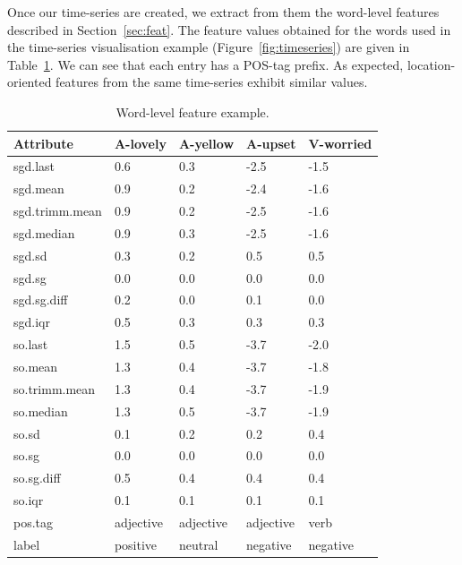 \documentclass{sig-alternate}
\begin{document}
   
Once our time-series are created, we extract from them the word-level features described in Section~\ref{sec:feat}. The feature values obtained for the words used in the time-series visualisation example (Figure~\ref{fig:timeseries}) are given in Table~\ref{fig:featex}.  We can see that each entry has a POS-tag prefix.  As expected, location-oriented features from the same time-series exhibit similar values. %

\begin{table}[htb]
\scriptsize
\centering
\begin{tabular}{l|llll}
  \hline
Attribute & A-lovely & A-yellow & A-upset & V-worried \\ 
  \hline
sgd.last &  0.6 &  0.3 & -2.5 & -1.5 \\ 
  sgd.mean &  0.9 &  0.2 & -2.4 & -1.6 \\ 
  sgd.trimm.mean &  0.9 &  0.2 & -2.5 & -1.6 \\ 
  sgd.median &  0.9 &  0.3 & -2.5 & -1.6 \\ 
  sgd.sd & 0.3 & 0.2 & 0.5 & 0.5 \\ 
  sgd.sg & 0.0 & 0.0 & 0.0 & 0.0 \\ 
  sgd.sg.diff & 0.2 & 0.0 & 0.1 & 0.0 \\ 
  sgd.iqr & 0.5 & 0.3 & 0.3 & 0.3 \\ 
  so.last &  1.5 &  0.5 & -3.7 & -2.0 \\ 
  so.mean &  1.3 &  0.4 & -3.7 & -1.8 \\ 
  so.trimm.mean &  1.3 &  0.4 & -3.7 & -1.9 \\ 
  so.median &  1.3 &  0.5 & -3.7 & -1.9 \\ 
  so.sd & 0.1 & 0.2 & 0.2 & 0.4 \\ 
  so.sg & 0.0 & 0.0 & 0.0& 0.0 \\ 
  so.sg.diff & 0.5 & 0.4 & 0.4 & 0.4 \\ 
  so.iqr & 0.1 & 0.1 & 0.1 & 0.1 \\ 
  pos.tag & adjective & adjective & adjective & verb \\ \hline
  label & positive & neutral & negative & negative \\ 
   \hline
\end{tabular}
\caption{Word-level feature example.}
\label{fig:featex}
\end{table}
\end{document}
